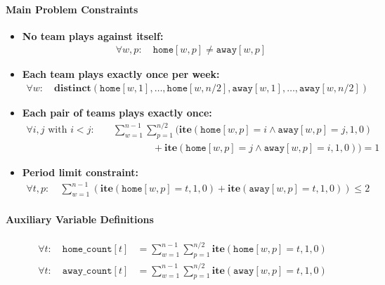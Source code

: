 \documentclass[11pt]{article}
\begin{document}
\paragraph{Main Problem Constraints}
\begin{itemize}
    \item \textbf{No team plays against itself:}
    \begin{align}
        \forall w, p: \quad \texttt{home}[w,p] \neq \texttt{away}[w,p]
    \end{align}

    \item \textbf{Each team plays exactly once per week:}
    \begin{align}
        \forall w: \quad
        \textbf{distinct}(\texttt{home}[w,1], \ldots, \texttt{home}[w,n/2], \texttt{away}[w,1], \ldots, \texttt{away}[w,n/2])
    \end{align}

    \item \textbf{Each pair of teams plays exactly once:}
    \begin{align}
        \forall i, j \text{ with } i < j: \quad
        &\sum_{w=1}^{n-1} \sum_{p=1}^{n/2} \Big( \textbf{ite}(\texttt{home}[w,p] = i \land \texttt{away}[w,p] = j, 1, 0) \nonumber \\
        &\qquad\qquad + \textbf{ite}(\texttt{home}[w,p] = j \land \texttt{away}[w,p] = i, 1, 0) \Big) = 1
    \end{align}

    \item \textbf{Period limit constraint:}
    \begin{align}
        \forall t, p: \quad
        \sum_{w=1}^{n-1} \left( \textbf{ite}(\texttt{home}[w,p] = t, 1, 0) + \textbf{ite}(\texttt{away}[w,p] = t, 1, 0) \right) \leq 2
    \end{align}
\end{itemize}

\paragraph{Auxiliary Variable Definitions}
\begin{align}
\forall t: \quad \texttt{home\_count}[t] &= \sum_{w=1}^{n-1} \sum_{p=1}^{n/2} \textbf{ite}(\texttt{home}[w,p] = t, 1, 0) \\
\forall t: \quad \texttt{away\_count}[t] &= \sum_{w=1}^{n-1} \sum_{p=1}^{n/2} \textbf{ite}(\texttt{away}[w,p] = t, 1, 0)
\end{align}
\end{document}

